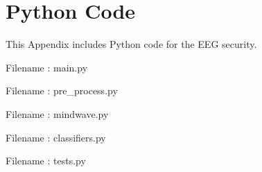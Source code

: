 \chapter{Python Code}

This Appendix includes Python code for the EEG security.
\pagebreak

\noindent Filename : main.py

\pagebreak
Filename : pre\_process.py

\pagebreak
Filename : mindwave.py

\pagebreak
Filename : classifiers.py

\pagebreak
Filename : tests.py


